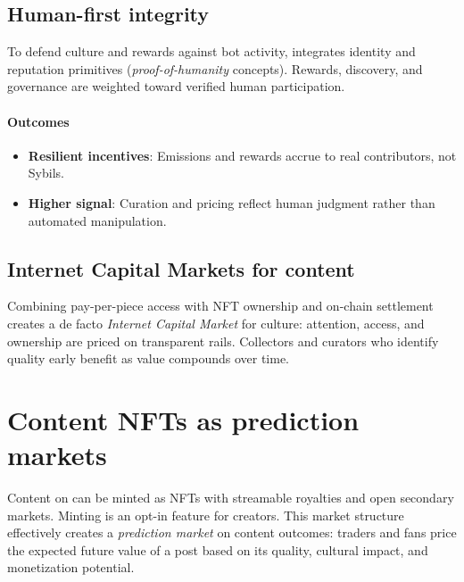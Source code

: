 \documentclass[10pt]{article}
\begin{document}
    \subsection{Human-first integrity}
      To defend culture and rewards against bot activity, \textbf{\projectname{}} integrates identity and reputation primitives (\textit{proof-of-humanity} concepts). Rewards, discovery, and governance are weighted toward verified human participation.

      \paragraph{Outcomes}
        \begin{itemize}[leftmargin=*]
          \item \textbf{Resilient incentives}: Emissions and rewards accrue to real contributors, not Sybils.
          \item \textbf{Higher signal}: Curation and pricing reflect human judgment rather than automated manipulation.
        \end{itemize}

    \subsection{Internet Capital Markets for content}
      Combining pay-per-piece access with NFT ownership and on-chain settlement creates a de facto \textit{Internet Capital Market} for culture: attention, access, and ownership are priced on transparent rails. Collectors and curators who identify quality early benefit as value compounds over time.

  \section{Content NFTs as prediction markets}
    Content on \textbf{\projectname{}} can be minted as NFTs with streamable royalties and open secondary markets. Minting is an opt-in feature for creators. This market structure effectively creates a \textit{prediction market} on content outcomes: traders and fans price the expected future value of a post based on its quality, cultural impact, and monetization potential.
\end{document}
